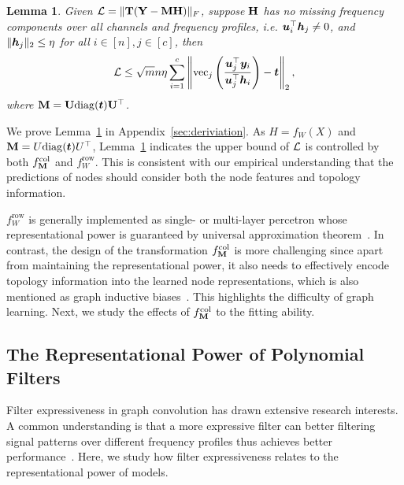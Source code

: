 \documentclass{article} %
\newtheorem{lemma}{\textbf{Lemma}}
\begin{document}
\begin{lemma}
	\label{prop:loss_bound}
	Given ${\mathcal{L}}=\|{\mathbf{T}}({\mathbf{Y}}-{\mathbf{M}}{\mathbf{H}})\|_F$, suppose ${\mathbf{H}}$ has no missing frequency components over all channels and frequency profiles, i.e. ${\bm{u}}_i^{\top}{\bm{h}}_j\neq 0$, and $\|{\bm{h}}_j\|_2\leq\eta$ for all $i\in[n],j\in[c]$, then
	\begin{equation}
		\label{equ:bound}
		\begin{aligned}
			{\mathcal{L}}\leq\sqrt{m}n\eta\sum_{i=1}^c\left\|\mathrm{vec}_j\left(\frac{{\bm{u}}_j^{\top}{\bm{y}}_i}{{\bm{u}}_j^{\top}{\bm{h}}_i}\right)-{\bm{t}}\right\|_2,
		\end{aligned}
	\end{equation}
	where ${\mathbf{M}}={\mathbf{U}}\mathrm{diag}({\bm{t}}){\mathbf{U}}^{\top}$.
\end{lemma}
We prove Lemma~\ref{prop:loss_bound} in Appendix~\ref{sec:deriviation}.
As $H=f_W(X)$ and ${\mathbf{M}}=U\mathrm{diag}({\bm{t}})U^{\top}$, Lemma~\ref{prop:loss_bound} indicates the upper bound of ${\mathcal{L}}$ is controlled by both $f_{{\mathbf{M}}}^{\mathrm{col}}$ and $f_W^{\mathrm{row}}$.
This is consistent with our empirical understanding that the predictions of nodes should consider both the node features and topology information.

$f_W^{\mathrm{row}}$ is generally implemented as single- or multi-layer percetron whose representational power is guaranteed by universal approximation theorem~\citep{hornik1989multilayer,cybenko1989approximation}.
In contrast, the design of the transformation $f_{{\mathbf{M}}}^{\mathrm{col}}$ is more challenging since apart from maintaining the representational power, it also needs to effectively encode topology information into the learned node representations, which is also mentioned as graph inductive biases~\citep{ma2023graph}.
This highlights the difficulty of graph learning.
Next, we study the effects of $f_{{\mathbf{M}}}^{\mathrm{col}}$ to the fitting ability.

\subsection{The Representational Power of Polynomial Filters}
Filter expressiveness in graph convolution has drawn extensive research interests.
A common understanding is that a more expressive filter can better filtering signal patterns over different frequency profiles thus achieves better performance~\citep{chien2021adaptive,he2021bernnet,JacobiConv,yang2022spectrum,bo2022specformer}.
Here, we study how filter expressiveness relates to the representational power of models.
\end{document}
